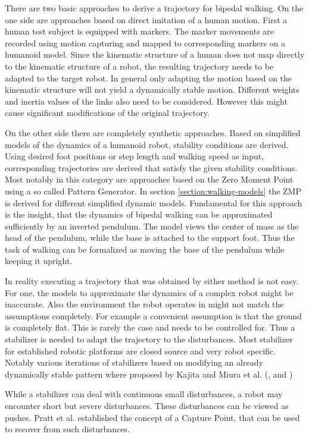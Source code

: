 \documentclass[english,ngerman]{KITreprt}
\begin{document}
There are two basic approaches to derive a trajectory for bipedal
walking. On the one side are approaches based on direct imitation of a
human motion. First a human test subject is equipped with markers. The
marker movements are recorded using motion capturing and mapped to
corresponding markers on a humanoid model. Since the kinematic structure
of a human does not map directly to the kinematic structure of a robot,
the resulting trajectory needs to be adapted to the target robot. In
general only adapting the motion based on the kinematic structure will
not yield a dynamically stable motion. Different weights and inertia
values of the links also need to be considered. However this might cause
significant modifications of the original trajectory.

On the other side there are completely synthetic approaches. Based on
simplified models of the dynamics of a humanoid robot, stability
conditions are derived. Using desired foot positions or step length and
walking speed as input, corresponding trajectories are derived that
satisfy the given stability conditions. Most notably in this category
are approaches based on the Zero Moment Point using a so called Pattern
Generator. In section \ref{section:walking-models} the ZMP is derived
for different simplified dynamic models. Fundamental for this approach
is the insight, that the dynamics of bipedal walking can be approximated
sufficiently by an inverted pendulum. The model views the center of mass
as the head of the pendulum, while the base is attached to the support
foot. Thus the task of walking can be formalized as moving the base of
the pendulum while keeping it upright.

In reality executing a trajectory that was obtained by either method is
not easy. For one, the models to approximate the dynamics of a complex
robot might be inaccurate. Also the environment the robot operates in
might not match the assumptions completely. For example a convenient
assumption is that the ground is completely flat. This is rarely the
case and needs to be controlled for. Thus a stabilizer is needed to
adapt the trajectory to the disturbances. Most stabilizer for
established robotic platforms are closed source and very robot specific.
Notably various iterations of stabilizers based on modifying an already
dynamically stable pattern where proposed by Kajita and Miura et al.
(\cite{kajita2010biped}, \cite{miura2011human} and
\cite{kajita2012evaluation})

While a stabilizer can deal with continuous small disturbances, a robot
may encounter short but severe disturbances. These disturbances can be
viewed as pushes. Pratt et al. established the concept of a Capture
Point, that can be used to recover from such disturbances.
\end{document}
